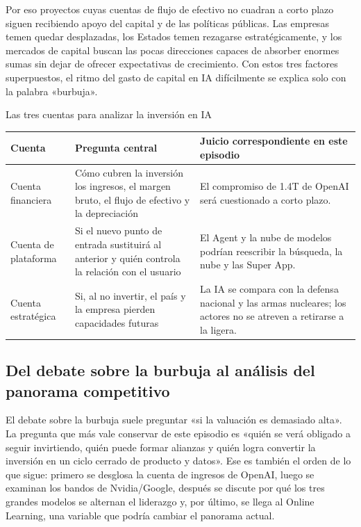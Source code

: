 \documentclass[a4paper]{article}
\begin{document}
Por eso proyectos cuyas cuentas de flujo de efectivo no cuadran a corto plazo siguen recibiendo apoyo del capital y de las políticas públicas. Las empresas temen quedar desplazadas, los Estados temen rezagarse estratégicamente, y los mercados de capital buscan las pocas direcciones capaces de absorber enormes sumas sin dejar de ofrecer expectativas de crecimiento. Con estos tres factores superpuestos, el ritmo del gasto de capital en IA difícilmente se explica solo con la palabra «burbuja».

\begin{importantbox}{Las tres cuentas para analizar la inversión en IA}
\begin{tabularx}{\textwidth}{p{}p{}X}
\toprule
Cuenta & Pregunta central & Juicio correspondiente en este episodio \\
\midrule
Cuenta financiera & Cómo cubren la inversión los ingresos, el margen bruto, el flujo de efectivo y la depreciación & El compromiso de 1.4T de OpenAI será cuestionado a corto plazo. \\
Cuenta de plataforma & Si el nuevo punto de entrada sustituirá al anterior y quién controla la relación con el usuario & El Agent y la nube de modelos podrían reescribir la búsqueda, la nube y las Super App. \\
Cuenta estratégica & Si, al no invertir, el país y la empresa pierden capacidades futuras & La IA se compara con la defensa nacional y las armas nucleares; los actores no se atreven a retirarse a la ligera. \\
\bottomrule
\end{tabularx}
\end{importantbox}

\subsection{Del debate sobre la burbuja al análisis del panorama competitivo}

El debate sobre la burbuja suele preguntar «si la valuación es demasiado alta». La pregunta que más vale conservar de este episodio es «quién se verá obligado a seguir invirtiendo, quién puede formar alianzas y quién logra convertir la inversión en un ciclo cerrado de producto y datos». Ese es también el orden de lo que sigue: primero se desglosa la cuenta de ingresos de OpenAI, luego se examinan los bandos de Nvidia/Google, después se discute por qué los tres grandes modelos se alternan el liderazgo y, por último, se llega al Online Learning, una variable que podría cambiar el panorama actual.
\end{document}
